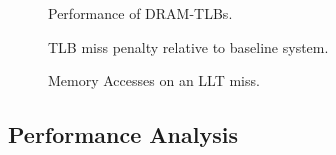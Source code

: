 



% 

\begin{figure}[tp] 
  \vspace{-0.in} \centering
  \centerline{}

  \caption{\small Performance of DRAM-TLBs. \normalsize}
  \label{fig:perf_stackedTLB} 
  \vspace{0.2 in}
\end{figure}

\begin{figure}[tp] 
  \vspace{0.in} \centering
  \centerline{}

  \caption{\small TLB miss penalty relative to baseline system.\normalsize}
  \label{fig:tlblat_stackedTLB} 
  \vspace{0.2 in}
\end{figure}

\begin{figure}[tp] 
  \vspace{0.in} \centering
  \centerline{}

  \caption{\small Memory Accesses on an LLT miss.\normalsize}
  \label{fig:tlblat_stackedTLB} 
  \vspace{-0.1 in}
\end{figure}

\subsection{Performance Analysis}


